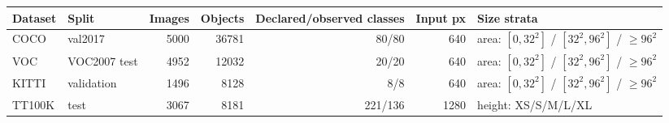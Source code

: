 \begin{tabular}{llrrrrp{5.2cm}}
\toprule
Dataset & Split & Images & Objects & Declared/observed classes & Input px & Size strata \\
\midrule
COCO & val2017 & 5000 & 36781 & 80/80 & 640 & area: $[0,32^2]$ / $[32^2,96^2]$ / $\geq96^2$ \\
VOC & VOC2007 test & 4952 & 12032 & 20/20 & 640 & area: $[0,32^2]$ / $[32^2,96^2]$ / $\geq96^2$ \\
KITTI & validation & 1496 & 8128 & 8/8 & 640 & area: $[0,32^2]$ / $[32^2,96^2]$ / $\geq96^2$ \\
TT100K & test & 3067 & 8181 & 221/136 & 1280 & height: XS/S/M/L/XL \\
\bottomrule
\end{tabular}
